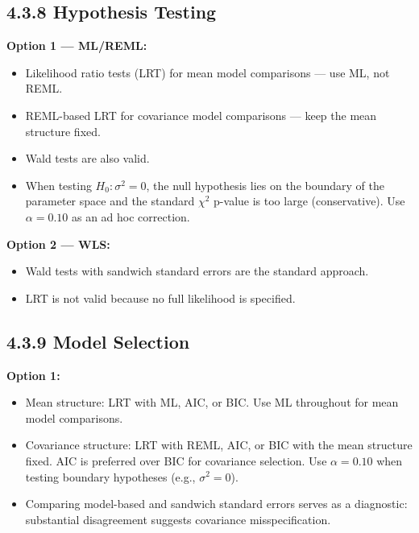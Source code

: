 \documentclass[11pt]{article}
\begin{document}
\subsection*{4.3.8 Hypothesis Testing}

\textbf{Option 1 --- ML/REML:}
\begin{itemize}[leftmargin=2em]
  \item Likelihood ratio tests (LRT) for mean model comparisons --- use ML, not REML.
  \item REML-based LRT for covariance model comparisons --- keep the mean structure fixed.
  \item Wald tests are also valid.
  \item When testing $H_0: \sigma^2 = 0$, the null hypothesis lies on the boundary of the parameter space and the standard $\chi^2$ p-value is too large (conservative). Use $\alpha = 0.10$ as an ad hoc correction.
\end{itemize}

\textbf{Option 2 --- WLS:}
\begin{itemize}[leftmargin=2em]
  \item Wald tests with sandwich standard errors are the standard approach.
  \item LRT is not valid because no full likelihood is specified.
\end{itemize}

\subsection*{4.3.9 Model Selection}

\textbf{Option 1:}
\begin{itemize}[leftmargin=2em]
  \item Mean structure: LRT with ML, AIC, or BIC. Use ML throughout for mean model comparisons.
  \item Covariance structure: LRT with REML, AIC, or BIC with the mean structure fixed. AIC is preferred over BIC for covariance selection. Use $\alpha = 0.10$ when testing boundary hypotheses (e.g., $\sigma^2 = 0$).
  \item Comparing model-based and sandwich standard errors serves as a diagnostic: substantial disagreement suggests covariance misspecification.
\end{itemize}
\end{document}
